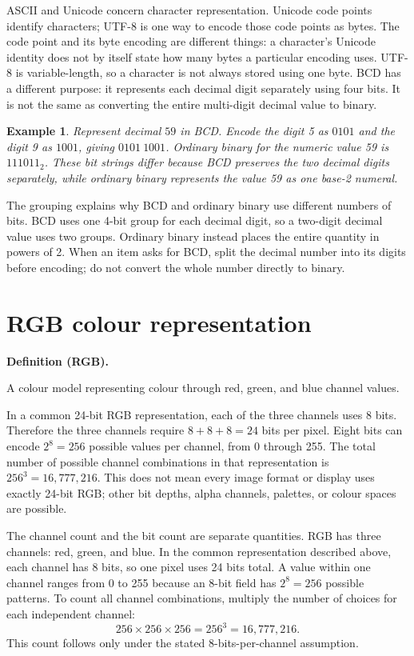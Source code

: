 \documentclass[11pt]{article}
\newtheorem{example}{Example}[section]
\newenvironment{definitionbox}[1]{%
  \par\noindent\textbf{Definition (#1).}\ \itshape
}{\par\vspace{0.3em}}
\begin{document}
ASCII and Unicode concern character representation. Unicode code points
identify characters; UTF-8 is one way to encode those code points as bytes.
The code point and its byte encoding are different things: a character's
Unicode identity does not by itself state how many bytes a particular
encoding uses. UTF-8 is variable-length, so a character is not always stored
using one byte. BCD has a different purpose: it represents each decimal
digit separately using four bits. It is not the same as converting the
entire multi-digit decimal value to binary.

\begin{example}
Represent decimal $59$ in BCD. Encode the digit 5 as $0101$ and the digit 9
as $1001$, giving $0101\ 1001$. Ordinary binary for the numeric value 59 is
$111011_2$. These bit strings differ because BCD preserves the two decimal
digits separately, while ordinary binary represents the value 59 as one
base-2 numeral.
\end{example}

The grouping explains why BCD and ordinary binary use different numbers of
bits. BCD uses one 4-bit group for each decimal digit, so a two-digit
decimal value uses two groups. Ordinary binary instead places the entire
quantity in powers of 2. When an item asks for BCD, split the decimal
number into its digits before encoding; do not convert the whole number
directly to binary.

\section{RGB colour representation}
\begin{definitionbox}{RGB}
A colour model representing colour through red, green, and blue channel
values.
\end{definitionbox}

In a common 24-bit RGB representation, each of the three channels uses 8
bits. Therefore the three channels require $8+8+8=24$ bits per pixel.
Eight bits can encode $2^8=256$ possible values per channel, from 0 through
255. The total number of possible channel combinations in that representation
is $256^3=16{,}777{,}216$. This does not mean every image format or display
uses exactly 24-bit RGB; other bit depths, alpha channels, palettes, or
colour spaces are possible.

The channel count and the bit count are separate quantities. RGB has three
channels: red, green, and blue. In the common representation described
above, each channel has 8 bits, so one pixel uses 24 bits total. A value
within one channel ranges from 0 to 255 because an 8-bit field has
$2^8=256$ possible patterns. To count all channel combinations, multiply
the number of choices for each independent channel:
\[
  256\times256\times256=256^3=16{,}777{,}216.
\]
This count follows only under the stated 8-bits-per-channel assumption.
\end{document}
